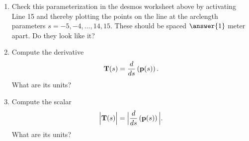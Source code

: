 \documentclass{ximera}
\begin{document}
\begin{question}
\begin{explanation}
\begin{enumerate}
\begin{enumerate}

\item Check this parameterization in the desmos worksheet above by activating Line 15 and thereby plotting the points on the line at the arclength parameters $s=-5, -4, \ldots , 14, 15$. These should be spaced $\answer{1}$ meter apart. Do they look like it?

\item Compute the derivative 
\[
     {\bf T}(s) = \frac{d}{ds}\left( {\bf p}(s) \right) . 
\]
What are its units?

\item Compute the scalar
\[
   \Big| {\bf T}(s) \Big|  = \Big|  \frac{d}{ds}\left( {\bf p}(s) \right) \Big| .
\]
What are its units? 
\begin{freeResponse}
\end{freeResponse}
\end{enumerate}

\end{enumerate}

\end{explanation}
 
\end{question}
\end{document}
